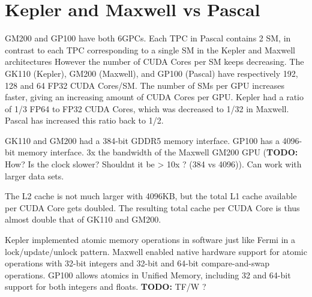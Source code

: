 
\section{Kepler and Maxwell vs Pascal}
GM200 and GP100 have both 6GPCs.
Each TPC in Pascal contains 2 SM, in contrast to each TPC corresponding to a single SM in the Kepler and Maxwell architectures
However the number of CUDA Cores per SM keeps decreasing.
The GK110 (Kepler), GM200 (Maxwell), and GP100 (Pascal) have respectively 192, 128 and 64 FP32 CUDA Cores/SM.
The number of SMs per GPU increases faster, giving an increasing amount of CUDA Cores per GPU.
Kepler had a ratio of 1/3 FP64 to FP32 CUDA Cores, which was decreased to 1/32 in Maxwell.
Pascal has increased this ratio back to 1/2.

GK110 and GM200 had a 384-bit GDDR5 memory interface.
GP100 has a 4096-bit memory interface.
3x the bandwidth of the Maxwell GM200 GPU (\textbf{TODO:} How? Is the clock slower? Shouldnt it be > 10x ? (384 vs 4096)).
Can work with larger data sets.

The L2 cache is not much larger with 4096KB, but the total L1 cache available per CUDA Core gets doubled.
The resulting total cache per CUDA Core is thus almost double that of GK110 and GM200.

Kepler implemented atomic memory operations in software just like Fermi in a lock/update/unlock pattern.
Maxwell enabled native hardware support for atomic operations with 32-bit integers and 32-bit and 64-bit compare-and-swap operations.
GP100 allows atomics in Unified Memory, including 32 and 64-bit support for both integers and floats.
\textbf{TODO:} TF/W ?

